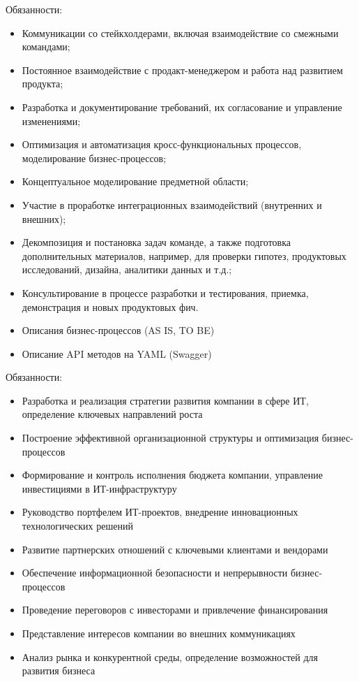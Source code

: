 \documentclass[10pt,a4paper,ragged2e,withhyper]{altacv}
\begin{document}
\textcolor{PastelRed}{Обязанности:}
\begin{itemize}

    \item Коммуникации со стейкхолдерами, включая взаимодействие со смежными командами;
    \item Постоянное взаимодействие с продакт-менеджером и работа над развитием продукта;
    \item Разработка и документирование требований, их согласование и управление изменениями;
    \item Оптимизация и автоматизация кросс-функциональных процессов, моделирование бизнес-процессов;
    \item Концептуальное моделирование предметной области;
    \item Участие в проработке интеграционных взаимодействий (внутренних и внешних);
    \item Декомпозиция и постановка задач команде, а также подготовка дополнительных материалов, например, для проверки гипотез, продуктовых исследований, дизайна, аналитики данных и т.д.;
    \item Консультирование в процессе разработки и тестирования, приемка, демонстрация и новых продуктовых фич.
    \item Описания бизнес-процессов (AS IS, TO BE)
    \item Описание API методов на YAML (Swagger)

\end{itemize}

\divider

\textcolor{PastelRed}{Обязанности:}
\begin{itemize}
    \item Разработка и реализация стратегии развития компании в сфере ИТ, определение ключевых направлений роста
    \item Построение эффективной организационной структуры и оптимизация бизнес-процессов
    \item Формирование и контроль исполнения бюджета компании, управление инвестициями в ИТ-инфраструктуру
    \item Руководство портфелем ИТ-проектов, внедрение инновационных технологических решений
    \item Развитие партнерских отношений с ключевыми клиентами и вендорами
    \item Обеспечение информационной безопасности и непрерывности бизнес-процессов
    \item Проведение переговоров с инвесторами и привлечение финансирования
    \item Представление интересов компании во внешних коммуникациях
    \item Анализ рынка и конкурентной среды, определение возможностей для развития бизнеса
\end{itemize}
\end{document}
